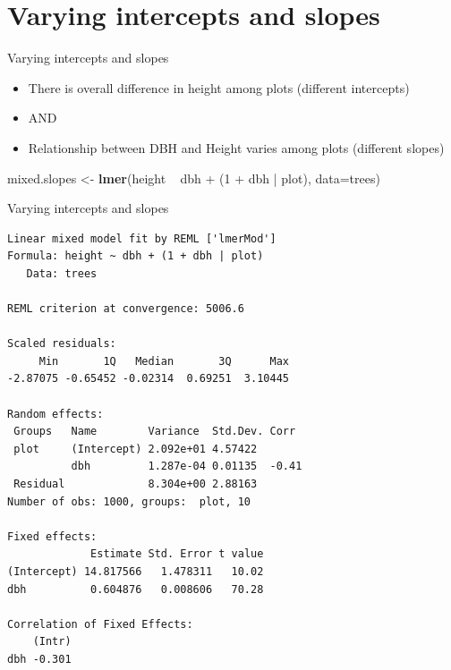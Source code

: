 \documentclass[10pt,ignorenonframetext,]{beamer}
\newenvironment{Shaded}{\begin{snugshade}}{\end{snugshade}}
\newcommand{\KeywordTok}[1]{\textcolor[rgb]{0.13,0.29,0.53}{\textbf{{#1}}}}
\newcommand{\DataTypeTok}[1]{\textcolor[rgb]{0.13,0.29,0.53}{{#1}}}
\newcommand{\DecValTok}[1]{\textcolor[rgb]{0.00,0.00,0.81}{{#1}}}
\newcommand{\StringTok}[1]{\textcolor[rgb]{0.31,0.60,0.02}{{#1}}}
\newcommand{\NormalTok}[1]{{#1}}
\begin{document}
\section{Varying intercepts and
slopes}\label{varying-intercepts-and-slopes}

\begin{frame}[fragile]{Varying intercepts and slopes}

\begin{itemize}[<+->]
\item
  There is overall difference in height among plots (different
  intercepts)
\item
  AND
\item
  Relationship between DBH and Height varies among plots (different
  slopes)
\end{itemize}

\begin{Shaded}
\begin{Highlighting}[]
\NormalTok{mixed.slopes <-}\StringTok{ }\KeywordTok{lmer}\NormalTok{(height ~}\StringTok{ }\NormalTok{dbh +}\StringTok{ }\NormalTok{(}\DecValTok{1} \NormalTok{+}\StringTok{ }\NormalTok{dbh |}\StringTok{ }\NormalTok{plot), }\DataTypeTok{data=}\NormalTok{trees)}
\end{Highlighting}
\end{Shaded}

\end{frame}

\begin{frame}[fragile]{Varying intercepts and slopes}

\begin{verbatim}
Linear mixed model fit by REML ['lmerMod']
Formula: height ~ dbh + (1 + dbh | plot)
   Data: trees

REML criterion at convergence: 5006.6

Scaled residuals: 
     Min       1Q   Median       3Q      Max 
-2.87075 -0.65452 -0.02314  0.69251  3.10445 

Random effects:
 Groups   Name        Variance  Std.Dev. Corr 
 plot     (Intercept) 2.092e+01 4.57422       
          dbh         1.287e-04 0.01135  -0.41
 Residual             8.304e+00 2.88163       
Number of obs: 1000, groups:  plot, 10

Fixed effects:
             Estimate Std. Error t value
(Intercept) 14.817566   1.478311   10.02
dbh          0.604876   0.008606   70.28

Correlation of Fixed Effects:
    (Intr)
dbh -0.301
\end{verbatim}

\end{frame}
\end{document}
